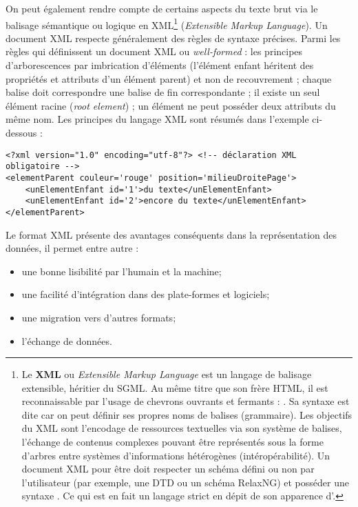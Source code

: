 On peut également rendre compte de certains aspects du texte brut via le balisage sémantique ou logique en XML\footnote{Le \textbf{XML} ou \textit{Extensible Markup Language} est un langage de balisage extensible, héritier du SGML. Au même titre que son frère HTML, il est reconnaissable par l'usage de chevrons ouvrants et fermants : \citecode{< >}. Sa syntaxe est dite  car on peut définir ses propres noms de balises (grammaire). Les objectifs du XML sont l'encodage de ressources textuelles via son système de balises, l'échange de contenus complexes pouvant être représentés sous la forme d'arbres entre systèmes d'informations hétérogènes (intéropérabilité). Un document XML pour être  doit respecter un schéma défini ou non par l'utilisateur (par exemple, une DTD ou un schéma RelaxNG) et posséder une syntaxe . Ce qui est en fait un langage strict en dépit de son apparence d'.} (\textit{Extensible Markup Language}). Un document XML respecte généralement des règles de syntaxe précises. Parmi les règles qui définissent un document XML  ou \textit{well-formed} : les principes d'arborescences par imbrication d'éléments (l'élément enfant héritent des propriétés et attributs d'un élément parent) et non de recouvrement ; chaque balise doit correspondre une balise de fin correspondante ; il existe un seul élément racine (\textit{root element}) ; un élément ne peut posséder deux attributs du même nom. Les principes du langage XML sont résumés dans l'exemple ci-dessous : \\

\lstset{language=XML}
\begin{lstlisting}
<?xml version="1.0" encoding="utf-8"?> <!-- déclaration XML obligatoire -->
<elementParent couleur='rouge' position='milieuDroitePage'>
    <unElementEnfant id='1'>du texte</unElementEnfant>
    <unElementEnfant id='2'>encore du texte</unElementEnfant>
</elementParent>
\end{lstlisting} 
\newpage
Le format XML présente des avantages conséquents dans la représentation des données, il permet entre autre :
\begin{itemize}
    \item une bonne lisibilité par l'humain et la machine;
    \item une facilité d'intégration dans des plate-formes et logiciels;
    \item une migration vers d'autres formats;
    \item l'échange de données.
\end{itemize}

